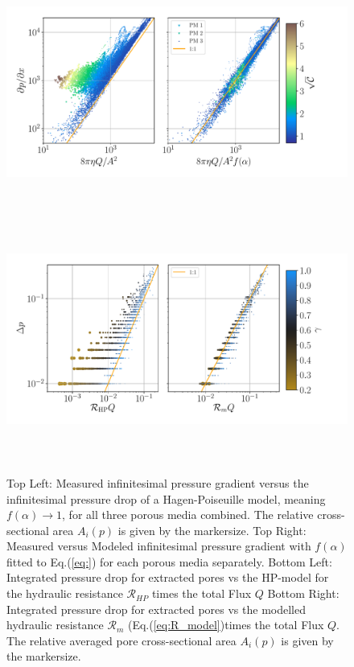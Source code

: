 \documentclass[draft]{agujournal2019}
\begin{document}
\begin{figure}
\includegraphics[height=8cm]{figures/infi_dpdx_combined.pdf}
\includegraphics[height=8cm]{figures/integral_dp_combined.pdf}
\caption{Top Left: Measured infinitesimal pressure gradient versus the infinitesimal pressure drop of a Hagen-Poiseuille model, meaning $f(\alpha)\rightarrow 1$, for all three porous media combined. The relative cross-sectional area $A_i(p)$ is given by the markersize. Top Right: Measured versus Modeled infinitesimal pressure gradient with $f(\alpha)$ fitted to Eq.(\ref{eq:}) for each porous media separately. Bottom Left: Integrated pressure drop for extracted pores vs the HP-model for the hydraulic resistance $\mathcal{R}_{HP}$ times the total Flux $Q$ Bottom Right: Integrated pressure drop for extracted pores vs the modelled hydraulic resistance $\mathcal{R}_m$ (Eq.(\ref{eq:R_model})times the total Flux $Q$. The relative averaged pore cross-sectional area $A_i(p)$ is given by the markersize.}
\label{fig:local_and_integrated}
\end{figure}
\end{document}
